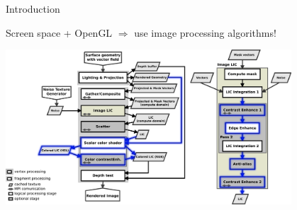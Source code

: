 \documentclass[notes]{beamer}
\begin{document}
\begin{frame}{Introduction}
  \begin{beamerboxesrounded}{Screen space + OpenGL $\Rightarrow$ use image processing algorithms!}
  \begin{center}
    \includegraphics[width=4.2in]{ce-flow-ce.png}
  \end{center}
  \end{beamerboxesrounded}
  \end{frame}
\end{document}
